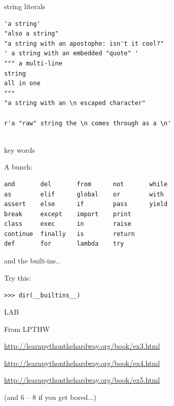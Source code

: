 \documentclass{beamer}
\begin{document}
\begin{frame}[fragile]{string literals}

\begin{verbatim}
'a string'
"also a string"
"a string with an apostophe: isn't it cool?"
' a string with an embedded "quote" '
""" a multi-line
string
all in one
"""
"a string with an \n escaped character"

r'a "raw" string the \n comes through as a \n'
 
\end{verbatim}

\end{frame}

\begin{frame}[fragile]{key words}

{\Large  A bunch:}

\vspace{0.2in}
\begin{verbatim}
and       del       from      not       while    
as        elif      global    or        with     
assert    else      if        pass      yield    
break     except    import    print              
class     exec      in        raise              
continue  finally   is        return             
def       for       lambda    try
\end{verbatim}

\end{frame}

\begin{frame}[fragile]{and the built-ins..}

{\Large  Try this: 

\vspace{0.2in}
\verb+>>> dir(__builtins__)+

}
\end{frame}


\begin{frame}[fragile]{LAB}

{\large From LPTHW }

\vspace{0.2in}
\url{http://learnpythonthehardway.org/book/ex3.html}

\vspace{0.2in}
\url{http://learnpythonthehardway.org/book/ex4.html}

\vspace{0.2in}
\url{http://learnpythonthehardway.org/book/ex5.html}

(and 6 -- 8 if you get bored...)

\end{frame}
\end{document}

